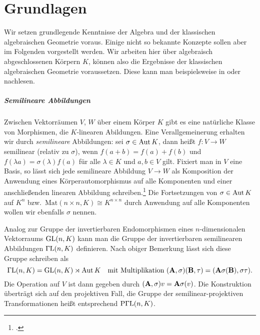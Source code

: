 \chapter{Grundlagen} \label{chap:prelim}
Wir setzen grundlegende Kenntnisse der Algebra und der klassischen algebraischen Geometrie voraus. Einige nicht so bekannte Konzepte sollen aber im Folgenden vorgestellt werden. Wir arbeiten hier über algebraisch abgeschlossenen Körpern $K$, können also die Ergebnisse der klassischen algebraischen Geometrie voraussetzen. Diese kann man beispielsweise in \cite{Shafarevich} oder \cite{Mumford} nachlesen.

\paragraph{Semilineare Abbildungen} Zwischen Vektorräumen $V$, $W$ über einem Körper $K$ gibt es eine natürliche Klasse von Morphismen, die $K$-linearen Abildungen. Eine Verallgemeinerung erhalten wir durch \emph{semilineare} Abbildungen: sei $\sigma \in \operatorname{Aut} K$, dann heißt $f: V \to W$ semilinear (relativ zu $\sigma$), wenn $f(a+b) = f(a) + f(b)$ und $f(\lambda a) = \sigma(\lambda)f(a)$ für alle $\lambda \in K$ und $a, b \in V$ gilt. Fixiert man in $V$ eine Basis, so lässt sich jede semilineare Abbildung $V \to W$ als Komposition der Anwendung eines Körperautomorphismus auf alle Komponenten und einer anschließenden linearen Abbildung schreiben.\footcite[Das folgt leicht aus den Bemerkungen in][S.~2--3]{Dieudonne} Die Fortsetzungen von $\sigma \in \operatorname{Aut} K$ auf $K^n$ bzw.~$\mathrm{Mat}(n \times n, K) \cong K^{n \times n}$ durch Anwendung auf alle Komponenten wollen wir ebenfalls $\sigma$ nennen.

Analog zur Gruppe der invertierbaren Endomorphismen eines $n$-dimensionalen Vektorraums $\mathrm{GL}(n,K)$ kann man die Gruppe der invertierbaren semilinearen Abbildungen $\mathrm{\Gamma L}(n,K)$ definieren. Nach obiger Bemerkung lässt sich diese Gruppe schreiben als
\begin{equation}
\mathrm{\Gamma L}(n,K) = \mathrm{GL}(n,K) \rtimes \operatorname{Aut} K \quad\text{mit Multiplikation } (\mathbf{A}, \sigma)(\mathbf{B}, \tau) = (\mathbf{A} \sigma(\mathbf{B}), \sigma \tau).
\end{equation}
Die Operation auf $V$ ist dann gegeben durch $(\mathbf{A}, \sigma)v = \mathbf{A} \sigma(v)$. Die Konstruktion überträgt sich auf den projektiven Fall, die Gruppe der semilinear-projektiven Transformationen heißt entsprechend $\mathrm{P\Gamma L}(n,K)$.


